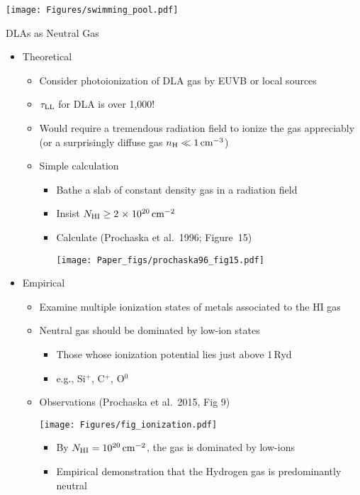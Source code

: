 \documentclass[12pt,letterpaper]{article}
\begin{document}
\begin{Aenumerate}
\begin{itemize}
\begin{itemize}
\begin{itemize}
\texttt{[image: Figures/swimming\_pool.pdf]}

      \end{itemize}
    \end{itemize}

  \end{itemize}

{\bf \item DLAs as Neutral Gas}
  \begin{itemize}
  \item Theoretical
    \begin{itemize}
    \item Consider photoionization of DLA gas by EUVB or
    local sources
    \item $\tau_{\rm LL}$ for DLA is over 1,000!
    \item Would require a tremendous radiation field to 
    ionize the gas appreciably (or a surprisingly diffuse gas 
    $n_{\rm H} \ll 1 \, {\rm cm^{-3}}$)
    \item Simple calculation
      \begin{itemize}
      \item Bathe a slab of constant density gas in a radiation
      field 
      \item Insist $N_{\rm HI} \ge 2{\; \times \; 10^{20}} \, {\rm cm^{-2}}$
      \item Calculate (Prochaska et al.\ 1996; Figure~15)

\texttt{[image: Paper\_figs/prochaska96\_fig15.pdf]}

      \end{itemize}
    \end{itemize}

  \item Empirical
    \begin{itemize}
    \item Examine multiple ionization states of metals associated
    to the HI gas
    \item Neutral gas should be dominated by low-ion states
      \begin{itemize}
      \item Those whose ionization potential lies just above 1\,Ryd
      \item e.g., Si$^+$, C$^+$, O$^0$
      \end{itemize}
    \item Observations (Prochaska et al.\ 2015, Fig 9)

\texttt{[image: Figures/fig\_ionization.pdf]}
      \begin{itemize}
      \item By $N_{\rm HI} = 10^{20} \, {\rm cm^{-2}}$, the gas is dominated by
      low-ions
      \item Empirical demonstration that the Hydrogen gas is
      predominantly neutral
      \end{itemize}


\end{itemize}
\end{itemize}
\end{Aenumerate}
\end{document}
